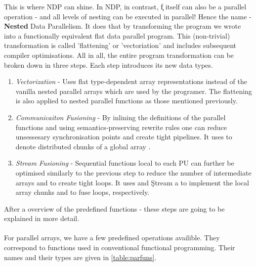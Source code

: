     
    This is where NDP can shine. In NDP, in contrast, \c{f} itself can
    also be a parallel operation - and all levels of nesting can
    be executed in parallel! Hence the name - \textbf{Nested} Data Parallelism.
    It does that by transforming the program we wrote into a functionally
    equivalent flat data parallel program. This (non-trivial) transformation
    is called 'flattening' or 'vectoriation' and includes subsequent compiler optimisations.
    All in all, the entire program transformation can be broken down in three steps.
    Each step introduces its new data types.
    \begin{enumerate}
      \item \emph{Vectorization} -
        Uses flat type-dependent array \pav{} representations instead of the
        vanilla nested parallel arrays \pan{} which are used by the programer.
        The flattening is also applied to nested parallel functions as
        those mentioned previously.
      \item \emph{Communicaiton Fusioning} -
        By inlining the definitions of the parallel functions and
        using semantics-preserving rewrite rules one can
        reduce unsessesary synchronisation points and
        create tight pipelines. It uses \pad{} to denote
        distributed chunks of a global array \pav{}.
      \item \emph{Stream Fusioning} -
        Sequential functions local to each PU can further
        be optimised similarly to the previous step
        to reduce the number of intermediate arrays and
        to create tight loops.
        It uses  and \c{Stream a} to
        implement the local array chunks and to fuse loops, respectively.
    \end{enumerate}
    
  After a overview of the predefined functions - these steps
  are going to be explained in more detail.
  
  \paragraph{}
    For parallel arrays, we have a few predefined operations availible.
    They correspond to functions used in conventional functional programming.
    Their names and their types are given in \ref{table:parfuns}.
    
